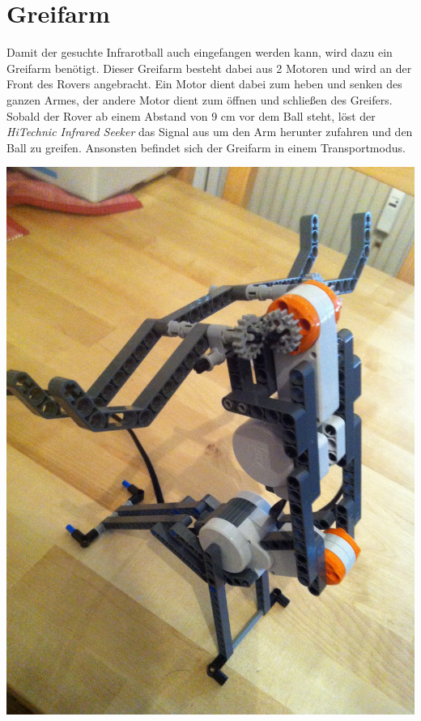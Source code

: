 \section{Greifarm}
Damit der gesuchte Infrarotball auch eingefangen werden kann, wird dazu ein Greifarm benötigt. Dieser Greifarm besteht dabei aus 2 Motoren und wird an der Front des Rovers angebracht. Ein Motor dient dabei zum heben und senken des ganzen Armes, der andere Motor dient zum öffnen und schließen des Greifers. Sobald der Rover ab einem Abstand von 9 cm vor dem Ball steht, löst der \textit{HiTechnic Infrared Seeker} das Signal aus um den Arm herunter zufahren und den Ball zu greifen. Ansonsten befindet sich der Greifarm in einem Transportmodus.

\begin{capfigure}
	\includegraphics[width=\textwidth]{images/construction/greifarm/Greifarm1}
\end{capfigure}

